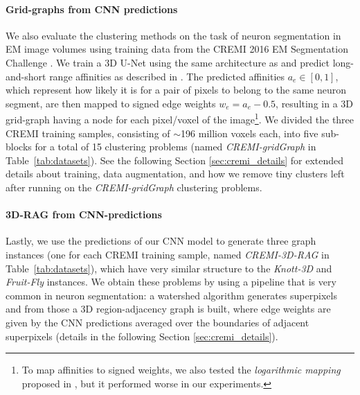 \paragraph{Grid-graphs from CNN predictions}  We also evaluate the clustering methods on the task of neuron segmentation in EM image volumes using training data from the CREMI 2016 EM Segmentation Challenge \cite{cremi}.
We train a 3D U-Net \cite{ronneberger2015u,cciccek20163d} using the same architecture as \cite{funke2018large} and predict long-and-short range affinities 
as described in \cite{lee2017superhuman}. The predicted affinities $a_e\in[0,1]$, which represent how likely it is for a pair of pixels to belong to the same neuron segment, are then mapped to signed edge weights $w_e=a_e-0.5$, resulting in a 3D grid-graph having a node for each pixel/voxel of the  image\footnote{To map affinities to signed weights, we also tested the \emph{logarithmic mapping} proposed in \cite{finkel2008enforcing,andres2012globally}, but it performed worse in our experiments.}. 
We divided the three CREMI training samples, consisting of $\sim$196 million voxels each, into five sub-blocks for a total of 15 clustering problems (named \emph{CREMI-gridGraph} in Table~\ref{tab:datasets}). See the following Section \ref{sec:cremi_details} for extended details about training, data augmentation, and how we remove tiny clusters left after running \algname{} on the \emph{CREMI-gridGraph} clustering problems.

\paragraph{3D-RAG from CNN-predictions} Lastly, we use the predictions of our CNN model to generate three graph instances (one for each CREMI training sample, named \emph{CREMI-3D-RAG} in Table~\ref{tab:datasets}), which have very similar structure to the \emph{Knott-3D} and \emph{Fruit-Fly} instances.  We obtain these problems by using a pipeline that is very common in neuron segmentation: a watershed algorithm generates superpixels and from those a 3D region-adjacency graph is built, where edge weights are given by the CNN predictions averaged over the boundaries of adjacent superpixels (details in the following Section \ref{sec:cremi_details}). 


